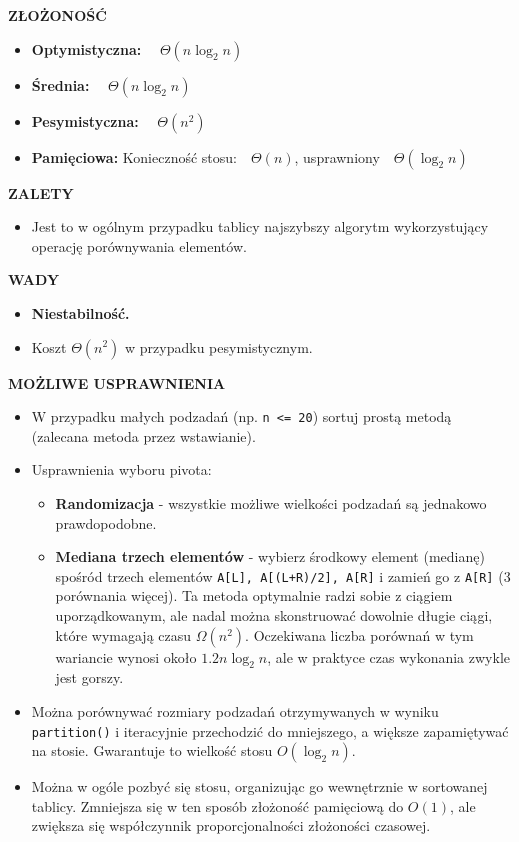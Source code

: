 \documentclass[advanced-sorts.tex]{subfiles}
\begin{document}
    \pagebreak

    \textbf{ZŁOŻONOŚĆ}
    \begin{itemize}
        \item \textbf{Optymistyczna:} ~~$\Theta(n \log_2 n)$
        \item \textbf{Średnia:} ~~$\Theta(n \log_2 n)$
        \item \textbf{Pesymistyczna:} ~~$\Theta(n^2)$
        \item \textbf{Pamięciowa:} Konieczność stosu:~~$\Theta(n)$,
            usprawniony~~$\Theta(\log_2 n)$
    \end{itemize}

    \textbf{ZALETY}
    \begin{itemize}
        \item Jest to w ogólnym przypadku tablicy najszybszy algorytm
            wykorzystujący operację porównywania elementów.
    \end{itemize}

    \textbf{WADY}
    \begin{itemize}
        \item \textbf{Niestabilność.}
        \item Koszt $\Theta(n^2)$ w przypadku pesymistycznym.
    \end{itemize}

    \textbf{MOŻLIWE USPRAWNIENIA}
    \begin{itemize}
        \item W przypadku małych podzadań (np. \texttt{n <= 20}) sortuj prostą
            metodą (zalecana metoda przez wstawianie).
        \item Usprawnienia wyboru pivota:
            \begin{itemize}
                \item \textbf{Randomizacja} - wszystkie możliwe wielkości
                    podzadań są jednakowo prawdopodobne.
                \item \textbf{Mediana trzech elementów} - wybierz środkowy
                    element (medianę) spośród trzech elementów
                    \texttt{A[L], A[(L+R)/2], A[R]} i zamień go z \texttt{A[R]}
                    (3 porównania więcej). Ta metoda optymalnie radzi sobie z
                    ciągiem uporządkowanym, ale nadal można skonstruować
                    dowolnie długie ciągi, które wymagają czasu $\Omega(n^2)$.
                    Oczekiwana liczba porównań w tym wariancie wynosi około
                    $1.2 n \log_2 n$, ale w praktyce czas wykonania zwykle jest
                    gorszy.
            \end{itemize}
        \item Można porównywać rozmiary podzadań otrzymywanych w wyniku\\
            \texttt{partition()} i iteracyjnie przechodzić do mniejszego, a
            większe zapamiętywać na stosie. Gwarantuje to wielkość stosu
            $O(\log_2 n)$.
        \item Można w ogóle pozbyć się stosu, organizując go wewnętrznie w
            sortowanej tablicy. Zmniejsza się w ten sposób złożoność pamięciową
            do $O(1)$, ale zwiększa się współczynnik proporcjonalności
            złożoności czasowej.
    \end{itemize}
\end{document}
